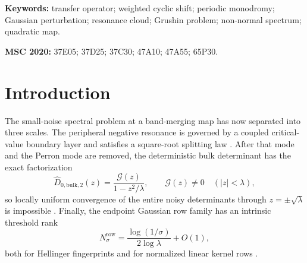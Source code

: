 \documentclass[11pt]{article}
\theoremstyle{definition}
\theoremstyle{remark}
\newcommand{\cG}{\mathcal G}
\begin{document}
\begin{abstract}
High-precision computations give
$C_M=1.946342905200967\ldots$.  With the integer selected independently from
the preceding endpoint-row calculation, the resulting finite-$k$ radii are
closer than the limiting radius to every archived cloud mean.  These spectral
comparisons are ordinary floating-point diagnostics.  We do not claim that
$W_k$ is already a Feshbach block of the noisy Markov operator.
\end{abstract}

\noindent\textbf{Keywords:} transfer operator; weighted cyclic shift;
periodic monodromy; Gaussian perturbation; resonance cloud; Grushin problem;
non-normal spectrum; quadratic map.

\medskip
\noindent\textbf{MSC 2020:} 37E05; 37D25; 37C30; 47A10; 47A55; 65P30.

\section{Introduction}
\label{sec:introduction}

The small-noise spectral problem at a band-merging map has now separated into
three scales.  The peripheral negative resonance is governed by a coupled
critical-value boundary layer and satisfies a square-root splitting law
\citep{WangBoundaryLayer2026}.  After that mode and the Perron mode are
removed, the deterministic bulk determinant has the exact factorization
\begin{equation}\label{eq:intro-pole}
 \widehat D_{0,\mathrm{bulk},2}(z)
 =\frac{\cG(z)}{1-z^2/\lambda},
 \qquad \cG(z)\ne0\quad (|z|<\lambda),
\end{equation}
so locally uniform convergence of the entire noisy determinants through
$z=\pm\sqrt\lambda$ is impossible
\citep{WangBulkScattering2026}.  Finally, the endpoint Gaussian row family
has an intrinsic threshold rank
\begin{equation}\label{eq:intro-rank}
 N_\sigma^{\mathrm{row}}
 =\frac{\log(1/\sigma)}{2\log\lambda}+O(1),
\end{equation}
both for Hellinger fingerprints and for normalized linear kernel rows
\citep{WangEndpointRank2026}.
\end{document}
